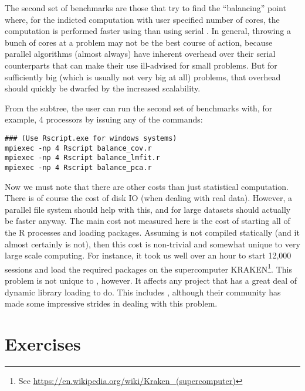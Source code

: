 The second set of benchmarks are those that try to find the ``balancing''
point where, for the indicted computation with user specified number of
cores, the computation is performed faster using 
than using serial . In general, throwing a bunch of cores at
a problem may not be the best course of action, because parallel algorithms
(almost always) have inherent overhead over their serial counterparts that
can make their use ill-advised for small problems. But for sufficiently
big (which is usually not very big at all) problems, that overhead should
quickly be dwarfed by the increased scalability.

From the  subtree, the user can run the second set of
benchmarks with, for example, 4 processors by issuing any of the commands:
\begin{lstlisting}
### (Use Rscript.exe for windows systems)
mpiexec -np 4 Rscript balance_cov.r
mpiexec -np 4 Rscript balance_lmfit.r
mpiexec -np 4 Rscript balance_pca.r
\end{lstlisting}

Now we must note that there are other costs than just statistical
computation. There is of course the cost of disk IO (when dealing with real
data). However, a parallel file system should help with this, and for large
datasets should actually be faster anyway. The main cost not measured here
is the cost of starting all of the R processes and loading packages.
Assuming  is not compiled statically (and it almost certainly
is not), then this cost is non-trivial and somewhat unique to very large
scale computing. For instance, it took us well over an hour to start
12,000  sessions and load the required packages on the
supercomputer
KRAKEN\footnote{See \url{https://en.wikipedia.org/wiki/Kraken_(supercomputer)}}.  This problem is not unique to , however.  It affects any project that has a great deal of dynamic library loading to do.  This includes , although their community has made some impressive strides in dealing with this problem.




\section{Exercises}
\label{sec:introduction_exercise}


